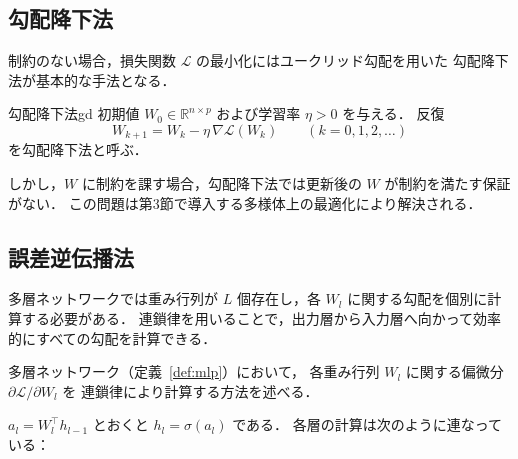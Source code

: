 \documentclass[uplatex, dvipdfmx]{jsarticle}
\begin{document}
\subsection{勾配降下法}

制約のない場合，損失関数 $\mathcal{L}$ の最小化にはユークリッド勾配を用いた
勾配降下法が基本的な手法となる．

\begin{definition}{勾配降下法}{gd}
初期値 $W_0\in\mathbb{R}^{n\times p}$ および学習率 $\eta>0$ を与える．
反復
\[
W_{k+1} = W_k - \eta\,\nabla \mathcal{L}(W_k)
\qquad (k=0,1,2,\ldots)
\]
を勾配降下法と呼ぶ．
\end{definition}

しかし，$W$ に制約を課す場合，勾配降下法では更新後の $W$ が制約を満たす保証がない．
この問題は第3節で導入する多様体上の最適化により解決される．

\subsection{誤差逆伝播法}

多層ネットワークでは重み行列が $L$ 個存在し，各 $W_l$ に関する勾配を個別に計算する必要がある．
連鎖律を用いることで，出力層から入力層へ向かって効率的にすべての勾配を計算できる．

多層ネットワーク（定義~\ref{def:mlp}）において，
各重み行列 $W_l$ に関する偏微分 $\partial\mathcal{L}/\partial W_l$ を
連鎖律により計算する方法を述べる．

$a_l=W_l^\top h_{l-1}$ とおくと $h_l=\sigma(a_l)$ である．
各層の計算は次のように連なっている：
\end{document}
